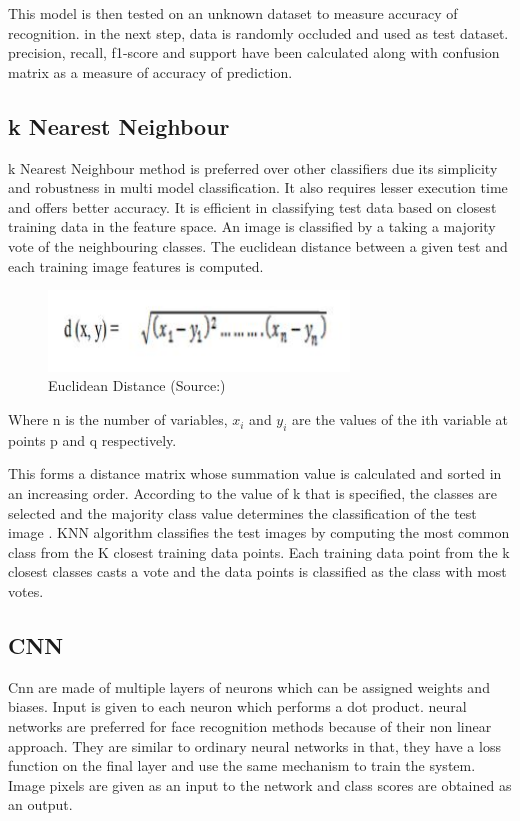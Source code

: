 \documentclass[conference]{IEEEtran}
\begin{document}
This model is then tested on an unknown dataset to measure accuracy of recognition. in the next step, data is randomly occluded and used as test dataset. precision, recall, f1-score and support have been calculated along with confusion matrix as a measure of accuracy of prediction. 

\subsection{k Nearest Neighbour}
\label{subsec:3.2 k Nearest Neighbour}
k Nearest Neighbour method is preferred over other classifiers due its simplicity and robustness in multi model classification. It also requires lesser execution time and offers better accuracy. It is efficient in classifying test data based on closest training data in the feature space. An image is classified by a taking a majority vote of the neighbouring classes. The euclidean distance between a given test and each training image features is computed. 

\begin{figure}[h!]
 \centering
 \includegraphics[width = 8cm]{euclidean_distance11.JPG}
 \caption{ Euclidean Distance (Source:\cite{weinberger2006distance})}
 \label{fig 1: Euclidean Distance}
\end{figure}

Where n is the number of variables, $x_i$ and $y_i$ are the values of the ith variable at points p and q respectively. 

This forms a distance matrix whose summation value is calculated and sorted in an increasing order. According to the value of k that is specified, the classes are selected and the majority class value determines the classification of the test image \cite{kaur2012k}. KNN algorithm classifies the test images by computing the most common class from the K closest training data points. Each training data point from the k closest classes casts a vote and the data points is classified as the class with most votes.

\subsection{CNN}
\label{subsec:3.3 CNN}
Cnn are made of multiple layers of neurons which can be assigned weights and biases. Input is given to each neuron which performs a dot product. neural networks are preferred for face recognition methods because of their non linear approach. They are similar to ordinary neural networks in that, they have a loss function on the final layer and use the same mechanism to train the system. Image pixels are given as an input to the network and class scores are obtained as an output. 
\end{document}
